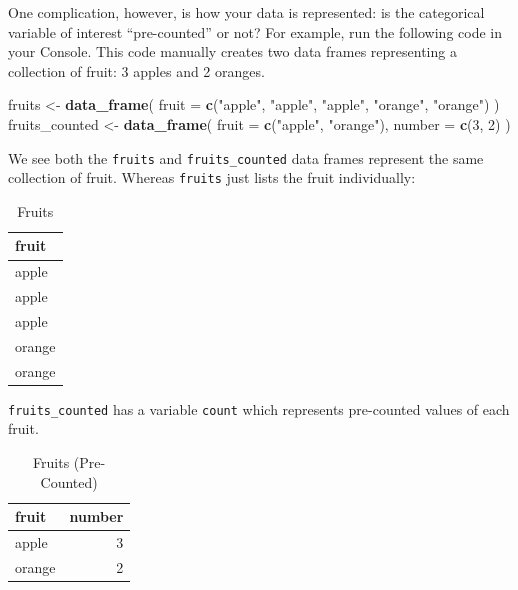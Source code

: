 \documentclass[12pt,]{krantz}
\makeatletter
\newenvironment{Shaded}{\begin{snugshade}}{\end{snugshade}}
\newcommand{\KeywordTok}[1]{\textcolor[rgb]{0.27,0.27,0.27}{\textbf{#1}}}
\newcommand{\DataTypeTok}[1]{\textcolor[rgb]{0.27,0.27,0.27}{#1}}
\newcommand{\DecValTok}[1]{\textcolor[rgb]{0.06,0.06,0.06}{#1}}
\newcommand{\StringTok}[1]{\textcolor[rgb]{0.5,0.5,0.5}{#1}}
\newcommand{\NormalTok}[1]{#1}
\newenvironment{kframe}{%
\medskip{}
\setlength{\fboxsep}{.8em}
 \def\at@end@of@kframe{}%
 \ifinner\ifhmode%
  \def\at@end@of@kframe{\end{minipage}}%
  \begin{minipage}{\columnwidth}%
 \fi\fi%
 \def\FrameCommand##1{\hskip\@totalleftmargin \hskip-\fboxsep
 \colorbox{shadecolor}{##1}\hskip-\fboxsep
     \hskip-\linewidth \hskip-\@totalleftmargin \hskip\columnwidth}%
 \MakeFramed {\advance\hsize-\width
   \@totalleftmargin\z@ \linewidth\hsize
   \@setminipage}}%
 {\par\unskip\endMakeFramed%
 \at@end@of@kframe}
\renewenvironment{Shaded}{\begin{kframe}}{\end{kframe}}
\theoremstyle{definition}
\theoremstyle{definition}
\theoremstyle{definition}
\theoremstyle{remark}
\makeatother
\begin{document}
One complication, however, is how your data is represented: is the
categorical variable of interest ``pre-counted'' or not? For example,
run the following code in your Console. This code manually creates two
data frames representing a collection of fruit: 3 apples and 2 oranges.

\begin{Shaded}
\begin{Highlighting}[]
\NormalTok{fruits <-}\StringTok{ }\KeywordTok{data_frame}\NormalTok{(}
  \DataTypeTok{fruit =} \KeywordTok{c}\NormalTok{(}\StringTok{"apple"}\NormalTok{, }\StringTok{"apple"}\NormalTok{, }\StringTok{"apple"}\NormalTok{, }\StringTok{"orange"}\NormalTok{, }\StringTok{"orange"}\NormalTok{)}
\NormalTok{)}
\NormalTok{fruits_counted <-}\StringTok{ }\KeywordTok{data_frame}\NormalTok{(}
  \DataTypeTok{fruit =} \KeywordTok{c}\NormalTok{(}\StringTok{"apple"}\NormalTok{, }\StringTok{"orange"}\NormalTok{),}
  \DataTypeTok{number =} \KeywordTok{c}\NormalTok{(}\DecValTok{3}\NormalTok{, }\DecValTok{2}\NormalTok{)}
\NormalTok{)}
\end{Highlighting}
\end{Shaded}

We see both the \texttt{fruits} and \texttt{fruits\_counted} data frames
represent the same collection of fruit. Whereas \texttt{fruits} just
lists the fruit individually:

\begin{table}[H]

\caption{\label{tab:fruits}Fruits}
\centering
\fontsize{10}{12}\selectfont
\begin{tabular}[t]{l}
\toprule
fruit\\
\midrule
apple\\
apple\\
apple\\
orange\\
orange\\
\bottomrule
\end{tabular}
\end{table}

\texttt{fruits\_counted} has a variable \texttt{count} which represents
pre-counted values of each fruit.

\begin{table}[H]

\caption{\label{tab:fruitscounted}Fruits (Pre-Counted)}
\centering
\fontsize{10}{12}\selectfont
\begin{tabular}[t]{lr}
\toprule
fruit & number\\
\midrule
apple & 3\\
orange & 2\\
\bottomrule
\end{tabular}
\end{table}
\end{document}
